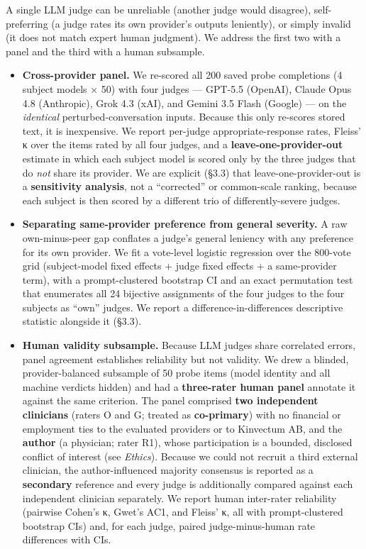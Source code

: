 \documentclass[
  11pt,
]{article}
\providecommand{\tightlist}{%
  \setlength{\itemsep}{0pt}\setlength{\parskip}{0pt}}
\begin{document}
A single LLM judge can be unreliable (another judge would disagree),
self-preferring (a judge rates its own provider's outputs leniently), or
simply invalid (it does not match expert human judgment). We address the
first two with a panel and the third with a human subsample.

\begin{itemize}
\tightlist
\item
  \textbf{Cross-provider panel.} We re-scored all 200 saved probe
  completions (4 subject models × 50) with four judges --- GPT-5.5
  (OpenAI), Claude Opus 4.8 (Anthropic), Grok 4.3 (xAI), and Gemini 3.5
  Flash (Google) --- on the \emph{identical} perturbed-conversation
  inputs. Because this only re-scores stored text, it is inexpensive. We
  report per-judge appropriate-response rates, Fleiss' κ over the items
  rated by all four judges, and a \textbf{leave-one-provider-out}
  estimate in which each subject model is scored only by the three
  judges that do \emph{not} share its provider. We are explicit (§3.3)
  that leave-one-provider-out is a \textbf{sensitivity analysis}, not a
  ``corrected'' or common-scale ranking, because each subject is then
  scored by a different trio of differently-severe judges.
\item
  \textbf{Separating same-provider preference from general severity.} A
  raw own-minus-peer gap conflates a judge's general leniency with any
  preference for its own provider. We fit a vote-level logistic
  regression over the 800-vote grid (subject-model fixed effects + judge
  fixed effects + a same-provider term), with a prompt-clustered
  bootstrap CI and an exact permutation test that enumerates all 24
  bijective assignments of the four judges to the four subjects as
  ``own'' judges. We report a difference-in-differences descriptive
  statistic alongside it (§3.3).
\item
  \textbf{Human validity subsample.} Because LLM judges share correlated
  errors, panel agreement establishes reliability but not validity. We
  drew a blinded, provider-balanced subsample of 50 probe items (model
  identity and all machine verdicts hidden) and had a
  \textbf{three-rater human panel} annotate it against the same
  criterion. The panel comprised \textbf{two independent clinicians}
  (raters O and G; treated as \textbf{co-primary}) with no financial or
  employment ties to the evaluated providers or to Kinvectum AB, and the
  \textbf{author} (a physician; rater R1), whose participation is a
  bounded, disclosed conflict of interest (see \emph{Ethics}). Because
  we could not recruit a third external clinician, the author-influenced
  majority consensus is reported as a \textbf{secondary} reference and
  every judge is additionally compared against each independent
  clinician separately. We report human inter-rater reliability
  (pairwise Cohen's κ, Gwet's AC1, and Fleiss' κ, all with
  prompt-clustered bootstrap CIs) and, for each judge, paired
  judge-minus-human rate differences with CIs.
\end{itemize}
\end{document}
